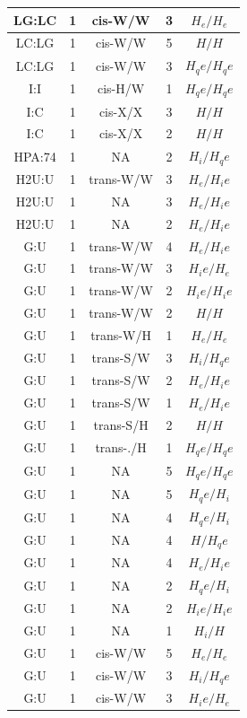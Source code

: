 \begin{center}
\begin{longtable}{c|c|c|c|c}
LG:LC & 1 & cis-W/W & 3 & $H_e/H_e$ \\  \hline
LC:LG & 1 & cis-W/W & 5 & $H/H$ \\  \hline
LC:LG & 1 & cis-W/W & 3 & $H_qe/H_qe$ \\  \hline
I:I & 1 & cis-H/W & 1 & $H_qe/H_qe$ \\  \hline
I:C & 1 & cis-X/X & 3 & $H/H$ \\  \hline
I:C & 1 & cis-X/X & 2 & $H/H$ \\  \hline
HPA:74 & 1 & NA & 2 & $H_i/H_qe$ \\  \hline
H2U:U & 1 & trans-W/W & 3 & $H_e/H_ie$ \\  \hline
H2U:U & 1 & NA & 3 & $H_e/H_ie$ \\  \hline
H2U:U & 1 & NA & 2 & $H_e/H_ie$ \\  \hline
G:U & 1 & trans-W/W & 4 & $H_e/H_ie$ \\  \hline
G:U & 1 & trans-W/W & 3 & $H_ie/H_e$ \\  \hline
G:U & 1 & trans-W/W & 2 & $H_ie/H_ie$ \\  \hline
G:U & 1 & trans-W/W & 2 & $H/H$ \\  \hline
G:U & 1 & trans-W/H & 1 & $H_e/H_e$ \\  \hline
G:U & 1 & trans-S/W & 3 & $H_i/H_qe$ \\  \hline
G:U & 1 & trans-S/W & 2 & $H_e/H_ie$ \\  \hline
G:U & 1 & trans-S/W & 1 & $H_e/H_ie$ \\  \hline
G:U & 1 & trans-S/H & 2 & $H/H$ \\  \hline
G:U & 1 & trans-./H & 1 & $H_qe/H_qe$ \\  \hline
G:U & 1 & NA & 5 & $H_qe/H_qe$ \\  \hline
G:U & 1 & NA & 5 & $H_qe/H_i$ \\  \hline
G:U & 1 & NA & 4 & $H_qe/H_i$ \\  \hline
G:U & 1 & NA & 4 & $H/H_qe$ \\  \hline
G:U & 1 & NA & 4 & $H_e/H_ie$ \\  \hline
G:U & 1 & NA & 2 & $H_qe/H_i$ \\  \hline
G:U & 1 & NA & 2 & $H_ie/H_ie$ \\  \hline
G:U & 1 & NA & 1 & $H_i/H$ \\  \hline
G:U & 1 & cis-W/W & 5 & $H_e/H_e$ \\  \hline
G:U & 1 & cis-W/W & 3 & $H_i/H_qe$ \\  \hline
G:U & 1 & cis-W/W & 3 & $H_ie/H_e$ \\  \hline

\end{longtable}
\end{center}
